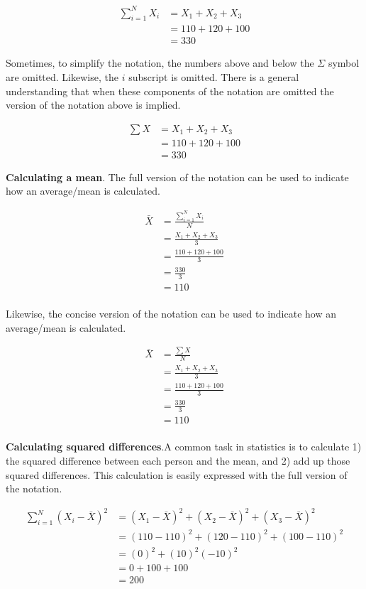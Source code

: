 \documentclass[
]{krantz}
\begin{document}
\[
\begin{aligned} 
\sum_{i=1}^{N} X_i &=  X_1 + X_2 + X_3\\ 
&= 110 + 120 + 100 \\
&= 330
\end{aligned} 
\]

Sometimes, to simplify the notation, the numbers above and below the \(\Sigma\) symbol are omitted. Likewise, the \(i\) subscript is omitted. There is a general understanding that when these components of the notation are omitted the version of the notation above is implied.

\[
\begin{aligned} 
\sum{X} &= X_1 + X_2 + X_3\\ 
&= 110 + 120 + 100\\
&= 330
\end{aligned} 
\]

\textbf{Calculating a mean}. The full version of the notation can be used to indicate how an average/mean is calculated.

\[
\begin{aligned} 
\bar{X} &= \frac{\sum_{i=1}^{N} X_i}{N} \\
&= \frac{X_1 + X_2 + X_3}{3}\\ 
&= \frac{110 + 120 + 100}{3}\\
&= \frac{330}{3}\\
&= 110\\
\end{aligned} 
\]

Likewise, the concise version of the notation can be used to indicate how an average/mean is calculated.

\[
\begin{aligned} 
\bar{X} &= \frac{\sum{X}}{N} \\
&= \frac{X_1 + X_2 + X_3}{3}\\ 
&= \frac{110 + 120 + 100}{3}\\
&= \frac{330}{3}\\
&= 110\\
\end{aligned} 
\]

\textbf{Calculating squared differences}.A common task in statistics is to calculate 1) the squared difference between each person and the mean, and 2) add up those squared differences. This calculation is easily expressed with the full version of the notation.

\[
\begin{aligned} 
\sum_{i=1}^{N}{(X_i - \bar{X})^2} &= (X_1-\bar{X})^2 + (X_2-\bar{X})^2 + (X_3-\bar{X})^2\\ 
&= (110-110)^2 + (120-110)^2 + (100-110)^2\\
&= (0)^2 + (10)^2 (-10)^2 \\
&= 0 + 100 + 100 \\
&= 200
\end{aligned} 
\]
\end{document}
